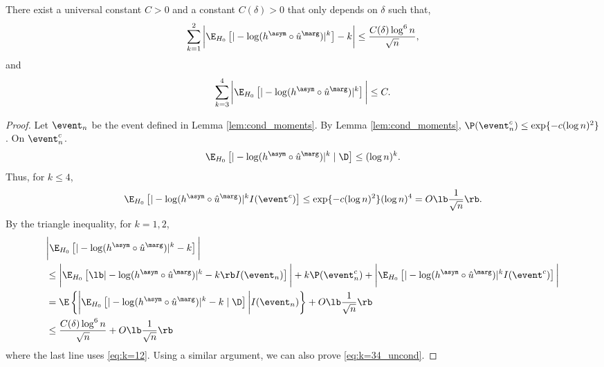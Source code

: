 \begin{lemma}\label{lem:uncond_moments}
  There exist a universal constant $C > 0$ and a constant $C(\delta) > 0$ that only depends on $\delta$ such that,
  \begin{equation}
    \label{eq:k=12_uncond}
    \sum_{k=1}^{2}\bigg|\E_{H_0}\left[|-\log (h^\asym \circ \hat{u}^\marg)|^k\right] - k\bigg| \le \frac{C(\delta)\log^6 n}{\sqrt{n}},
  \end{equation}
  and
  \begin{equation}
    \label{eq:k=34_uncond}
    \sum_{k=3}^{4}\bigg|\E_{H_0}\left[|-\log (h^\asym \circ \hat{u}^\marg)|^k\right]\bigg|\le C.
  \end{equation}

\end{lemma}
\begin{proof}
  Let $\event_n$ be the event defined in Lemma \ref{lem:cond_moments}. By Lemma \ref{lem:cond_moments}, $\P(\event_n^c) \le \exp\{-c(\log n)^2\}$. On $\event_n^c$.
  \[\E_{H_0}\left[|-\log (h^\asym \circ \hat{u}^\marg)|^k\mid \D\right]\le (\log n)^{k}.\]
  Thus, for $k\le 4$,
  \[\E_{H_0}\left[|-\log (h^\asym \circ \hat{u}^\marg)|^k I(\event^c)\right]\le \exp\{-c(\log n)^2\}(\log n)^4 = O\lb\frac{1}{\sqrt{n}}\rb.\]
  By the triangle inequality, for $k = 1, 2$,
  \begin{align*}
    &\bigg|\E_{H_0}\left[|-\log (h^\asym \circ \hat{u}^\marg)|^k - k\right]\bigg|\\
    & \le \bigg|\E_{H_0}\left[\lb |-\log (h^\asym \circ \hat{u}^\marg)|^k - k\rb I(\event_n)\right]\bigg| + k\P(\event_n^c) + \bigg|\E_{H_0}\left[|-\log (h^\asym \circ \hat{u}^\marg)|^k I(\event^c)\right]\bigg|\\
    & = \E\left\{\bigg|\E_{H_0}\left[|-\log (h^\asym \circ \hat{u}^\marg)|^k - k\mid \D\right]\bigg|I(\event_n)\right\} + O\lb\frac{1}{\sqrt{n}}\rb\\
    & \le \frac{C(\delta)\log^6 n}{\sqrt{n}} + O\lb\frac{1}{\sqrt{n}}\rb
  \end{align*}
  where the last line uses \eqref{eq:k=12}. Using a similar argument, we can also prove \eqref{eq:k=34_uncond}.
\end{proof}

